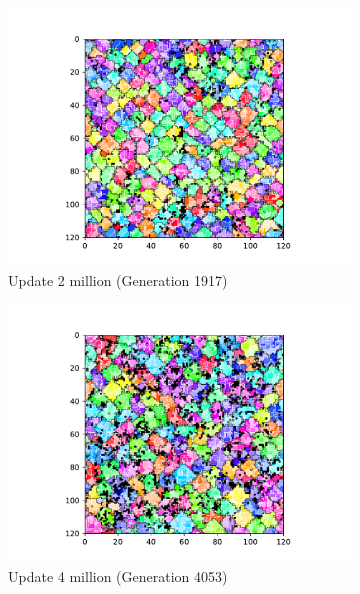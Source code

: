 \begin{figure}[t]
\begin{center}
\begin{subfigure}[b]{0.5\columnwidth}
  \includegraphics[width=\columnwidth,trim={2.5cm 0.5cm 2.5cm 1cm},clip]{img/ChannelMap_1011_update2000000}
  \caption{Update 2 million (Generation 1917)}
  \label{fig:ChannelMap_1011_update2000000}
\end{subfigure}%
\begin{subfigure}[b]{0.5\columnwidth}
  \includegraphics[width=\columnwidth,trim={2.5cm 0.5cm 2.5cm 1cm},clip]{img/ChannelMap_1011_update4000000}
  \caption{Update 4 million (Generation 4053)}
  \label{fig:ChannelMap_1011_update4000000}
\end{subfigure}
\begin{subfigure}[b]{0.5\columnwidth}

\end{subfigure}
\end{center}
\end{figure}
